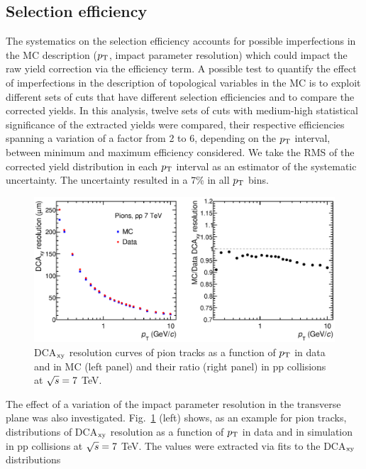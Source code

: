 \subsection{Selection efficiency}
\label{sec:CutVariation}
The systematics on the selection efficiency accounts for 
possible imperfections in the MC description ($p_{\rm T}$, 
impact parameter resolution) which could 
impact the raw yield correction via the efficiency term.
A possible test to quantify the effect of imperfections in the 
description of topological variables in the MC is to exploit different sets of cuts
that have different selection efficiencies and to compare the corrected
yields. In this analysis, twelve sets of cuts with 
medium-high statistical significance of the extracted yields were compared, 
their respective efficiencies spanning a variation of
a factor from 2 to 6, depending on the $p_{\rm T}$ interval, between minimum 
and maximum efficiency considered. We take the RMS 
of the corrected yield distribution in each $p_{\rm T}$ interval as an estimator of 
the systematic uncertainty. The uncertainty resulted in a 7\% in all $p_{\rm T}$ bins.
\begin{figure}[!b]
\begin{center}
 \includegraphics[width=1\textwidth]{FigCap4/DCAxyReso_Pions.eps}
\caption{DCA$_{\rm xy}$ resolution curves of pion tracks as a function of $p_{\rm T}$ in data and in MC (left panel) and their ratio (right panel) in pp collisions at $\sqrt{s} = 7 $ TeV.}             
\label{fig:DCAxyReso}
\end{center}
\end{figure}
The effect of a variation of the impact parameter resolution in the transverse plane
was also investigated. Fig.~\ref{fig:DCAxyReso} (left) shows, as an example for pion tracks, distributions of
DCA$_{\rm xy}$ resolution as a function of $p_{\rm T}$ in data and in simulation 
in pp collisions at $\sqrt{s} = 7 $ TeV. The values were extracted via fits to the DCA$_{\rm xy}$ distributions
